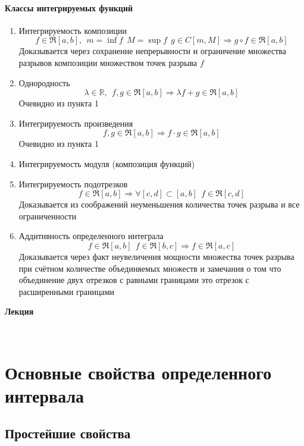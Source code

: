 \documentclass[a4paper,11pt]{article}
\newcounter{lecture}
\newcommand{\lecture}{ \noindent
\noindent \LARGE \textbf{
Лекция \thelecture  
\stepcounter{lecture}} \large 

\

}
\newcommand{\R}{\mathbb{R}}
\begin{document}
\paragraph{Классы интегрируемых функций}
\begin{enumerate} 
	\item Интегрируемость композиции
\[
f \in \Re[a, b], \ \ m = \inf f \ \ M = \sup f \ \ g \in C[m, M]  \Rightarrow g \circ f \in \Re[a, b]
\]
Доказывается через сохранение непрерывности и ограничение множества разрывов композиции множеством точек разрыва $f$
	\item Однородность
	\[
	\lambda \in \R, \ \ f, g \in \Re[a, b] \Rightarrow \lambda f + g \in \Re[a, b]
	\]
	Очевидно из пункта 1
	\item Интегрируемость произведения 
	\[
	f, g \in \Re[a, b]  \Rightarrow f\cdot g \in \Re[a, b]
	\]
	Очевидно из пункта 1
	\item Интегрируемость модуля (композиция функций)
	\item Интегрируемость подотрезков
	\[
	f \in \Re[a,b] \Rightarrow \forall [c, d] \subset [a, b] \ \  f \in \Re[c, d]
	\]
	Доказывается из соображений неуменьшения количества точек разрыва и все ограниченности
	\item Аддитивность определенного интеграла
	\[
	f \in \Re[a,b] \ \ f \in \Re[b, c] \Rightarrow f \in \Re[a, c]
	\]
	Доказывается через факт неувеличения мощности множества точек разрыва при счётном количестве объединяемых множеств и замечания о том что объединение двух отрезков с равными границами это отрезок с расширенными границами
	
\end{enumerate}

\lecture 
\section{Основные свойства определенного интервала}

\subsection{Простейшие свойства}
\end{document}
